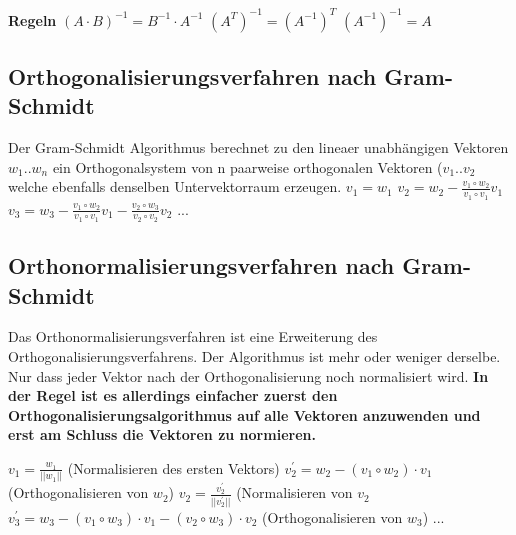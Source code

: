 \documentclass[11pt,a4paper,onecolumn]{scrartcl}
\begin{document}
\begin{flushleft}
\textbf{Regeln}\linebreak
$ (A \cdot B)^{-1} = B^{-1} \cdot A^{-1} $\linebreak
$ (A^{T})^{-1} = (A^{-1})^{T}$\linebreak
$ (A^{-1})^{-1} = A $\linebreak


\subsection{Orthogonalisierungsverfahren nach Gram-Schmidt}
Der Gram-Schmidt Algorithmus berechnet zu den lineaer unabhängigen Vektoren $w_{1} .. w_{n} $ ein Orthogonalsystem von n paarweise orthogonalen Vektoren ($v_{1} .. v_{2} $ welche ebenfalls denselben Untervektorraum erzeugen.\linebreak
\linebreak
$ v_{1} = w_{1} $ \linebreak
$ v_{2} = w_{2} - \frac{v_{1} \circ w_{2}}{v_{1} \circ v_{1}} v_{1} $ \linebreak
$ v_{3} = w_{3} - \frac{v_{1} \circ w_{2}}{v_{1} \circ v_{1}} v_{1} - \frac{v_{2} \circ w_{3}}{v_{2} \circ v_{2}} v_{2}$ \linebreak
...
\subsection{Orthonormalisierungsverfahren nach Gram-Schmidt}
Das Orthonormalisierungsverfahren ist eine Erweiterung des Orthogonalisierungsverfahrens. Der Algorithmus ist mehr oder weniger derselbe. Nur dass jeder Vektor nach der Orthogonalisierung noch normalisiert wird.\linebreak
\linebreak
\textbf{In der Regel ist es allerdings einfacher zuerst den Orthogonalisierungsalgorithmus auf alle Vektoren anzuwenden und erst am Schluss die Vektoren zu normieren.}
\linebreak

$ v_ {1} = \frac{w_{1}}{||w_{1}||} $ (Normalisieren des ersten Vektors)\linebreak
$ v^{'}_{2} = w_{2}-(v_{1} \circ w_{2}) \cdot v_{1} $ (Orthogonalisieren von $w_{2}$)\linebreak
$ v_{2} = \frac{v^{'}_{2}}{||v^{'}_{2}||} $ (Normalisieren von $v_{2}$\linebreak
$ v^{'}_{3} = w_{3}-(v_{1} \circ w_{3}) \cdot v_{1} - (v_{2} \circ w_{3}) \cdot v_{2} $ (Orthogonalisieren von $w_{3}$)\linebreak
...


\end{flushleft}
\end{document}

